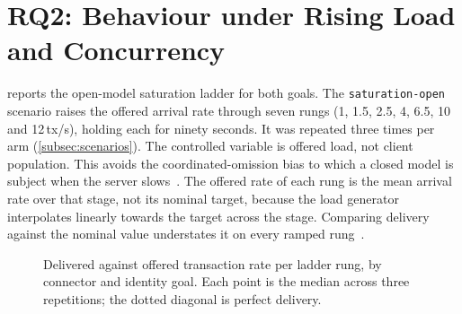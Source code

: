 \section{RQ2: Behaviour under Rising Load and Concurrency}\label{sec:rq2}


 reports the open-model saturation ladder for both goals. The \texttt{saturation-open} scenario raises the offered arrival rate through seven rungs (1, 1.5, 2.5, 4, 6.5, 10 and 12\,tx/s), holding each for ninety seconds. It was repeated three times per arm (\cref{subsec:scenarios}). The controlled variable is offered load, not client population. This avoids the coordinated-omission bias to which a closed model is subject when the server slows~\citep{schroeder2006open}. The offered rate of each rung is the mean arrival rate over that stage, not its nominal target, because the load generator interpolates linearly towards the target across the stage. Comparing delivery against the nominal value understates it on every ramped rung~\citep{k6docs}.

\begin{figure}[ht]
    \centering
    \caption[Delivered against offered transaction rate]{Delivered against offered transaction rate per ladder rung, by connector and identity goal. Each point is the median across three repetitions; the dotted diagonal is perfect delivery.}
    \label{fig:rq2-saturation}
\end{figure}

